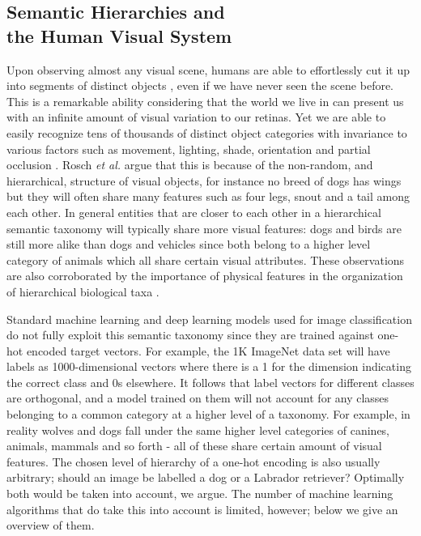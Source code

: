 \documentclass[12pt]{report}
\begin{document}
\subsection{Semantic Hierarchies and \\ the Human Visual System}
Upon observing almost any visual scene, humans are able to effortlessly cut it up into segments of distinct objects \cite{Rosch1976}, even if we have never seen the scene before. This is a remarkable ability considering that the world we live in can present us with an infinite amount of visual variation to our retinas. Yet we are able to easily recognize tens of thousands of distinct object categories \cite{Biederman1989} with invariance to various factors such as movement, lighting, shade, orientation and partial occlusion \cite{DiCarlo2012}. Rosch \textit{et al.} \cite{Rosch1976} argue that this is because of the non-random, and hierarchical, structure of visual objects, for instance no breed of dogs has wings but they will often share many features such as four legs, snout and a tail among each other. In general entities that are closer to each other in a hierarchical semantic taxonomy will typically share more visual features: dogs and birds are still more alike than dogs and vehicles since both belong to a higher level category of animals which all share certain visual attributes. These observations are also corroborated by the importance of physical features in the organization of hierarchical biological taxa \cite{Ohl2015}.

Standard machine learning and deep learning models used for image classification do not fully exploit this semantic taxonomy since they are trained against one-hot encoded target vectors. For example, the 1K ImageNet data set \cite{JiaDeng2009} will have labels as 1000-dimensional vectors where there is a 1 for the dimension indicating the correct class and 0s elsewhere. It follows that label vectors for different classes are orthogonal, and a model trained on them will not account for any classes belonging to a common category at a higher level of a taxonomy. For example, in reality wolves and dogs fall under the same higher level categories of canines, animals, mammals and so forth - all of these share certain amount of visual features. The chosen level of hierarchy of a one-hot encoding is also usually arbitrary; should an image be labelled a dog or a Labrador retriever? Optimally both would be taken into account, we argue. The number of machine learning algorithms that do take this into account is limited, however; below we give an overview of them.
\end{document}

